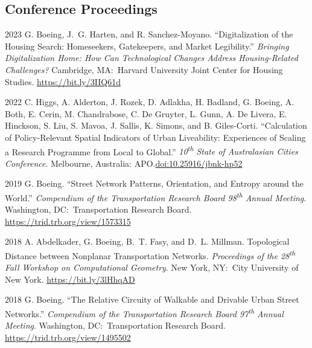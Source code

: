 \documentclass[11pt,letterpaper]{report}
\begin{document}
    \subsection*{Conference Proceedings}

    \begin{tablist}

        \item[2023] \tab{}G. Boeing, J.~G. Harten, and R. Sanchez-Moyano. \enquote{Digitalization of the Housing Search: Homeseekers, Gatekeepers, and Market Legibility.} \textit{Bringing Digitalization Home: How Can Technological Changes Address Housing-Related Challenges?} Cambridge, MA:\ Harvard University Joint Center for Housing Studies. \href{https://bit.ly/3IIQ61d}{https://bit.ly/3IIQ61d}

        \item[2022] \tab{}C. Higgs, A. Alderton, J. Rozek, D. Adlakha, H. Badland, G. Boeing, A. Both, E. Cerin, M. Chandrabose, C. De Gruyter, L. Gunn, A. De Livera, E. Hinckson, S. Liu, S. Mavoa, J. Sallis, K. Simons, and B. Giles-Corti. \enquote{Calculation of Policy-Relevant Spatial Indicators of Urban Liveability: Experiences of Scaling a Research Programme from Local to Global.} \textit{10\textsuperscript{th} State of Australasian Cities Conference}. Melbourne, Australia: APO.\@ \href{https://doi.org/10.25916/jbnk-hp52}{doi:10.25916/jbnk-hp52}

        \item[2019] \tab{}G. Boeing. \enquote{Street Network Patterns, Orientation, and Entropy around the World.} \textit{Compendium of the Transportation Research Board 98\textsuperscript{th} Annual Meeting}. Washington, DC:\ Transportation Research Board. \href{https://trid.trb.org/view/1573315}{https://trid.trb.org/view/1573315}

        \item[2018] \tab{}A. Abdelkader, G. Boeing, B.~T. Fasy, and D.~L. Millman. Topological Distance between Nonplanar Transportation Networks. \textit{Proceedings of the 28\textsuperscript{th} Fall Workshop on Computational Geometry}. New York, NY:\ City University of New York. \href{https://bit.ly/3lHhqAD}{https://bit.ly/3lHhqAD}

        \item[2018] \tab{}G. Boeing. \enquote{The Relative Circuity of Walkable and Drivable Urban Street Networks.} \textit{Compendium of the Transportation Research Board 97\textsuperscript{th} Annual Meeting}. Washington, DC:\ Transportation Research Board. \href{https://trid.trb.org/view/1495502}{https://trid.trb.org/view/1495502}

    \end{tablist}
\end{document}
